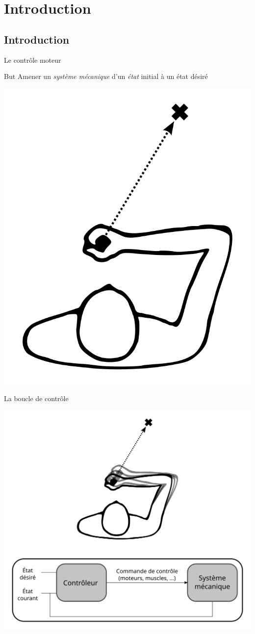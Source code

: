 \section*{Introduction}

\subsection*{Introduction}

\begin{frame}{Le contrôle moteur}
    \begin{block}{But}
        Amener un {\em système mécanique} d'un {\em état} initial à un état désiré
        \begin{center}
            \includegraphics[width=.40\linewidth]{fig/path}
        \end{center}
    \end{block}
\end{frame}

\begin{frame}{La boucle de contrôle}
    \begin{center}
        \includegraphics[width=.70\linewidth]{fig/ctrl2}
    \end{center}
\end{frame}


